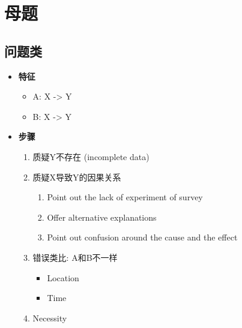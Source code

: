 \section{母题}

  \subsection{问题类}

    \begin{itemize}
      \item \textbf{特征}
      \begin{itemize}
        \item A: X -> Y
        \item B: X -> Y
      \end{itemize}

      \item \textbf{步骤}
      \begin{enumerate}
        \item 质疑Y不存在 (incomplete data)
        \item 质疑X导致Y的因果关系
        \begin{enumerate}
          \item Point out the lack of experiment of survey
          \item Offer alternative explanations
          \item Point out confusion around the cause and the effect
        \end{enumerate}

        \item 错误类比: A和B不一样
        \begin{itemize}
          \item Location
          \item Time
        \end{itemize}

        \item Necessity
      \end{enumerate}
    \end{itemize}
